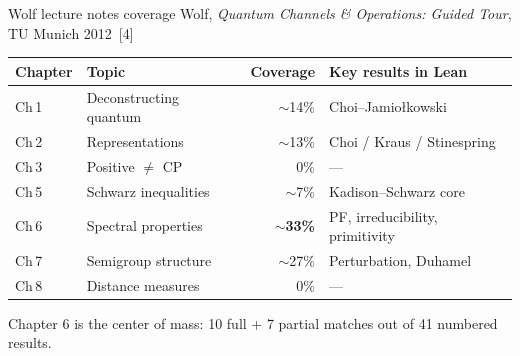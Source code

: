 \documentclass[aspectratio=169,10pt]{beamer}
\begin{document}
\begin{frame}{Wolf lecture notes coverage}
    \vspace{-0.2em}
    {\footnotesize Wolf, \emph{Quantum Channels \& Operations: Guided Tour}, TU Munich 2012~[4]}
    \vspace{0.3em}
    \begin{center}
    \renewcommand{\arraystretch}{1.15}
    \begin{tabular}{@{}l l r l@{}}
        \toprule
        \textbf{Chapter} & \textbf{Topic} & \textbf{Coverage} & \textbf{Key results in Lean} \\
        \midrule
        Ch\,1 & Deconstructing quantum & $\sim$14\% & Choi--Jamio{\l}kowski \\
        Ch\,2 & Representations & $\sim$13\% & Choi / Kraus / Stinespring \\
        Ch\,3 & Positive $\neq$ CP & 0\% & --- \\
        Ch\,5 & Schwarz inequalities & $\sim$7\% & Kadison--Schwarz core \\
        \rowcolor{lgrow}
        Ch\,6 & Spectral properties & $\sim$\textbf{33\%} & PF, irreducibility, primitivity \\
        Ch\,7 & Semigroup structure & $\sim$27\% & Perturbation, Duhamel \\
        Ch\,8 & Distance measures & 0\% & --- \\
        \bottomrule
    \end{tabular}
    \end{center}
    \vspace{0.4em}
    \textcolor{dimwhite}{\footnotesize Chapter 6 is the center of mass: 10 full + 7 partial matches out of 41 numbered results.}
\end{frame}
\end{document}
